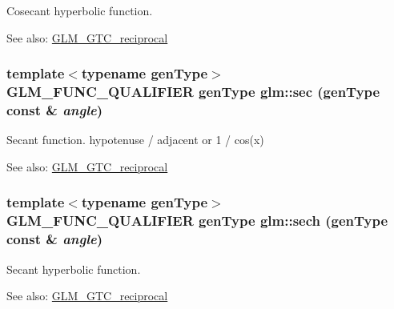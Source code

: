 Cosecant hyperbolic function.

\begin{Desc}
\item[See also:]\hyperlink{group__gtc__reciprocal}{GLM\_\-GTC\_\-reciprocal} \end{Desc}
\hypertarget{group__gtc__reciprocal_gef67dab7093a4d0ccc9c06ca05ddafd4}{
\subsubsection[sec]{\setlength{\rightskip}{0pt plus 5cm}template$<$typename genType$>$ GLM\_\-FUNC\_\-QUALIFIER genType glm::sec (genType const \& {\em angle})}}
\label{group__gtc__reciprocal_gef67dab7093a4d0ccc9c06ca05ddafd4}


Secant function. hypotenuse / adjacent or 1 / cos(x)

\begin{Desc}
\item[See also:]\hyperlink{group__gtc__reciprocal}{GLM\_\-GTC\_\-reciprocal} \end{Desc}
\hypertarget{group__gtc__reciprocal_g6193b8e823dea616d6badca8076da066}{
\subsubsection[sech]{\setlength{\rightskip}{0pt plus 5cm}template$<$typename genType$>$ GLM\_\-FUNC\_\-QUALIFIER genType glm::sech (genType const \& {\em angle})}}
\label{group__gtc__reciprocal_g6193b8e823dea616d6badca8076da066}


Secant hyperbolic function.

\begin{Desc}
\item[See also:]\hyperlink{group__gtc__reciprocal}{GLM\_\-GTC\_\-reciprocal} \end{Desc}
